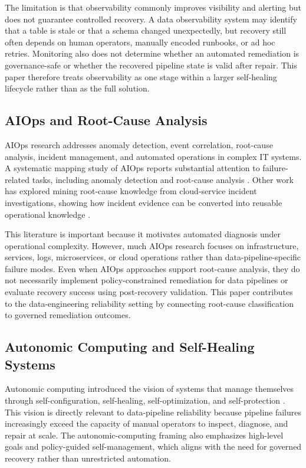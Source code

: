 The limitation is that observability commonly improves visibility and alerting but does not guarantee controlled recovery. A data observability system may identify that a table is stale or that a schema changed unexpectedly, but recovery still often depends on human operators, manually encoded runbooks, or ad hoc retries. Monitoring also does not determine whether an automated remediation is governance-safe or whether the recovered pipeline state is valid after repair. This paper therefore treats observability as one stage within a larger self-healing lifecycle rather than as the full solution.

\subsection{AIOps and Root-Cause Analysis}


AIOps research addresses anomaly detection, event correlation, root-cause analysis, incident management, and automated operations in complex IT systems. A systematic mapping study of AIOps reports substantial attention to failure-related tasks, including anomaly detection and root-cause analysis \cite{notaro2020aiops}. Other work has explored mining root-cause knowledge from cloud-service incident investigations, showing how incident evidence can be converted into reusable operational knowledge \cite{saha2022rootcause}.

This literature is important because it motivates automated diagnosis under operational complexity. However, much AIOps research focuses on infrastructure, services, logs, microservices, or cloud operations rather than data-pipeline-specific failure modes. Even when AIOps approaches support root-cause analysis, they do not necessarily implement policy-constrained remediation for data pipelines or evaluate recovery success using post-recovery validation. This paper contributes to the data-engineering reliability setting by connecting root-cause classification to governed remediation outcomes.

\subsection{Autonomic Computing and Self-Healing Systems}


Autonomic computing introduced the vision of systems that manage themselves through self-configuration, self-healing, self-optimization, and self-protection \cite{kephart2003vision}. This vision is directly relevant to data-pipeline reliability because pipeline failures increasingly exceed the capacity of manual operators to inspect, diagnose, and repair at scale. The autonomic-computing framing also emphasizes high-level goals and policy-guided self-management, which aligns with the need for governed recovery rather than unrestricted automation.

